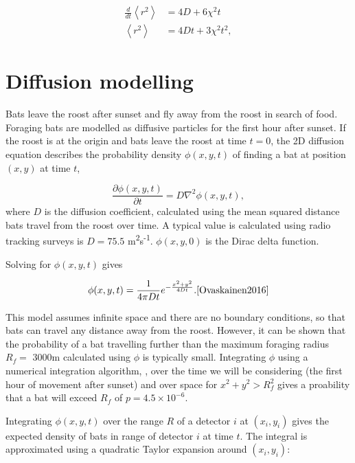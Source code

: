 \begin{equation}
\begin{split}
\frac{d}{dt} \left<r^2\right> &= 4D + 6\chi^2t \\
\left<r^2\right>              &= 4Dt + 3\chi^2t^2 ,
\nonumber
\end{split}
\end{equation}
%


\section{Diffusion modelling}

Bats leave the roost after sunset and fly away from the roost in search of food.
Foraging bats are modelled as diffusive particles for the first hour after
sunset. If the roost is at the origin and bats leave the roost at time $t =0$,
the 2D diffusion equation describes the probability density $\phi(x,y,t)$ of
finding a bat at position $(x,y)$ at time $t$,

\begin{equation}
  \frac{\partial \phi(x,y,t)}{\partial t} = D \nabla^2 \phi(x,y,t) ,
  \nonumber
\end{equation}
%
where $D$ is the diffusion coefficient, calculated using the mean squared distance bats travel from the roost over time. A typical value is calculated using radio tracking surveys is $D = 75.5$ m\textsuperscript{2}s\textsuperscript{-1}. $\phi(x,y,0)$ is
the Dirac delta function.

Solving for $\phi(x,y,t)$ gives

\begin{equation}
  \phi(x,y,t) = \frac{1}{4 \pi D t} e^{-\frac{x^2 + y^2}{4Dt}}. \cite{Ovaskainen2016}
  \nonumber
\end{equation}

This model assumes infinite space and there are no boundary conditions, so that bats can travel any distance away from the roost. However, it can be shown that the probability of a bat travelling further than the maximum foraging radius $R_f =$ 3000m calculated using $\phi$ is typically small. Integrating $\phi$ using a numerical integration algorithm, \cite{Berntsen1991}, over the time we will be considering (the first hour of movement after sunset) and over space for $x^2 + y^2 > R_f^2$ gives a proability that a bat will exceed $R_f$ of $p = 4.5 \times 10^{-6}$.

Integrating $\phi(x,y,t)$ over the range $R$ of a detector $i$ at $(x_i, y_i)$ gives
the expected density of bats in range of detector $i$ at time $t$. The
integral is approximated using a quadratic Taylor expansion around $(x_i, y_i)$:


